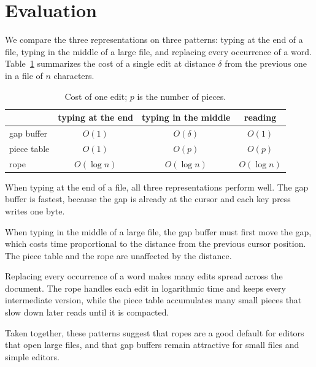 \section{Evaluation}
\label{sec:evaluation}
We compare the three representations on three patterns: typing at the end
of a file, typing in the middle of a large file, and replacing every
occurrence of a word. Table~\ref{tab:costs} summarizes the cost of a single
edit at distance $\delta$ from the previous one in a file of $n$ characters.

\begin{table}[h]
  \centering
  \begin{tabular}{lccc}
    & typing at the end & typing in the middle & reading \\
    \hline
    gap buffer  & $O(1)$       & $O(\delta)$ & $O(1)$ \\
    piece table & $O(1)$       & $O(p)$      & $O(p)$ \\
    rope        & $O(\log n)$ & $O(\log n)$ & $O(\log n)$ \\
  \end{tabular}
  \caption{Cost of one edit; $p$ is the number of pieces.}
  \label{tab:costs}
\end{table}

When typing at the end of a file, all three representations perform well.
The gap buffer is fastest, because the gap is already at the cursor and
each key press writes one byte.

When typing in the middle of a large file, the gap buffer must first move
the gap, which costs time proportional to the distance from the previous
cursor position. The piece table and the rope are unaffected by the
distance.

Replacing every occurrence of a word makes many edits spread across the
document. The rope handles each edit in logarithmic time and keeps every
intermediate version, while the piece table accumulates many small pieces
that slow down later reads until it is compacted.

Taken together, these patterns suggest that ropes are a good default for
editors that open large files, and that gap buffers remain attractive for
small files and simple editors.
